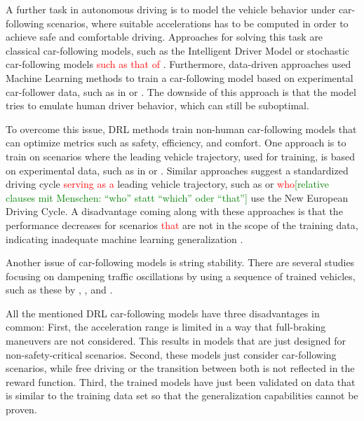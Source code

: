 \documentclass[review]{elsarticle}
\providecommand{\red}[1]{\textcolor{red}{#1}}
\providecommand{\green}[1]{\textcolor{green}{#1}}
\providecommand{\martin}[1]{\red{#1}} %
\providecommand{\martinc}[1]{\green{[#1]}} %
\providecommand{\3}{{\ss}}
\begin{document}
A further task in autonomous driving is to model the vehicle behavior
under car-following scenarios, where suitable accelerations has to be
computed in order to achieve safe and comfortable driving. Approaches
for solving this task are classical car-following models, such as the
Intelligent Driver Model \citep{Opus} or stochastic car-following
models \martin{such as that of} \cite{Treiber2018stochIDM_TRB}. Furthermore, data-driven approaches used Machine Learning methods to train a car-following model based on experimental car-follower data, such as in \cite{Chong2011SimulationOD} or \cite{ZHOU2017245}. The downside of this approach is that the model tries to emulate human driver behavior, which can still be suboptimal.

To overcome this issue, DRL methods train non-human car-following models that can optimize metrics such as safety, efficiency, and comfort. 
One approach is to train on scenarios where the leading vehicle
trajectory, used for training, is based on experimental data, such as
in \cite{SafeEfficientAndComfortable} or
\cite{HumanLikeAutonomouCF}. Similar approaches suggest a standardized
driving cycle \martin{serving as a} leading vehicle trajectory, such
as \cite{ComparisonRLvsMPC} or \cite{CFelectricVehicle}
\martin{who}\martinc{relative clauses mit Menschen: ``who'' statt
  ``which'' oder ``that''} use the New European Driving Cycle.
A disadvantage coming along with these approaches is that the
performance decreases for scenarios \martin{that} are not in the scope of the training data, indicating inadequate machine learning generalization \citep{ComparisonRLvsMPC}. 

Another issue of car-following models is string stability. There are
several studies focusing on dampening traffic oscillations by using a
sequence of trained vehicles, such as these by \cite{qu2020jointly}, \cite{DissipatingStopAndGoWaves}, and \cite{DampenStopAndGoTraffic}.

All the mentioned DRL car-following models have three disadvantages in
common: First, the acceleration range is limited in a way that
full-braking maneuvers are not considered. This results in models that are just designed for non-safety-critical scenarios. Second, these models just consider car-following scenarios, while free driving or the transition between both is not reflected in the reward function. Third, the trained models have just been validated on data that is similar to the training data set so that the generalization capabilities cannot be proven. 
\end{document}
